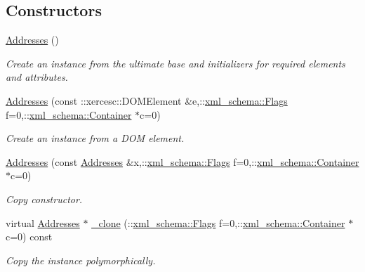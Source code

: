 \subsection*{Constructors}
\begin{DoxyCompactItemize}
\item 
\hypertarget{classopenstack_1_1xml_1_1Addresses_a58d8aef3937de09a13d329e3d5be2563}{
\hyperlink{classopenstack_1_1xml_1_1Addresses_a58d8aef3937de09a13d329e3d5be2563}{Addresses} ()}
\label{classopenstack_1_1xml_1_1Addresses_a58d8aef3937de09a13d329e3d5be2563}

\begin{DoxyCompactList}\small\item\em Create an instance from the ultimate base and initializers for required elements and attributes. \item\end{DoxyCompactList}\item 
\hyperlink{classopenstack_1_1xml_1_1Addresses_ac5c37dd5491edfccf9cd9f2639b2fa16}{Addresses} (const ::xercesc::DOMElement \&e,::\hyperlink{namespacexml__schema_affb4c227cbd9aa7453dd1dc5a1401943}{xml\_\-schema::Flags} f=0,::\hyperlink{namespacexml__schema_a333dea2213742aea47a37532dec4ec27}{xml\_\-schema::Container} $\ast$c=0)
\begin{DoxyCompactList}\small\item\em Create an instance from a DOM element. \item\end{DoxyCompactList}\item 
\hyperlink{classopenstack_1_1xml_1_1Addresses_acecac203839c9b19a2cc0c0db73172c5}{Addresses} (const \hyperlink{classopenstack_1_1xml_1_1Addresses}{Addresses} \&x,::\hyperlink{namespacexml__schema_affb4c227cbd9aa7453dd1dc5a1401943}{xml\_\-schema::Flags} f=0,::\hyperlink{namespacexml__schema_a333dea2213742aea47a37532dec4ec27}{xml\_\-schema::Container} $\ast$c=0)
\begin{DoxyCompactList}\small\item\em Copy constructor. \item\end{DoxyCompactList}\item 
virtual \hyperlink{classopenstack_1_1xml_1_1Addresses}{Addresses} $\ast$ \hyperlink{classopenstack_1_1xml_1_1Addresses_a26dab6198c2edd3957952c2a6c03e23b}{\_\-clone} (::\hyperlink{namespacexml__schema_affb4c227cbd9aa7453dd1dc5a1401943}{xml\_\-schema::Flags} f=0,::\hyperlink{namespacexml__schema_a333dea2213742aea47a37532dec4ec27}{xml\_\-schema::Container} $\ast$c=0) const 
\begin{DoxyCompactList}\small\item\em Copy the instance polymorphically. \item\end{DoxyCompactList}\end{DoxyCompactItemize}


